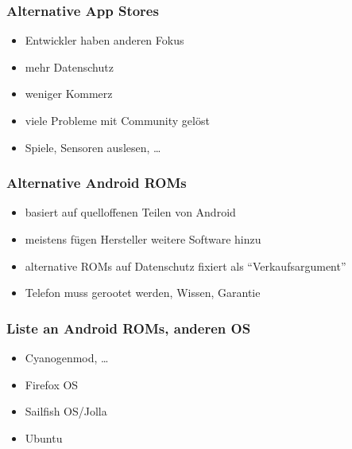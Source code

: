 \documentclass[12pt]{beamer}
\begin{document}
\begin{frame}
	\frametitle{Alternative App Stores}
	\begin{itemize}
		\item<2-> Entwickler haben anderen Fokus
		\item<3-> mehr Datenschutz
		\item<4-> weniger Kommerz
		\item<5-> viele Probleme mit Community gelöst
		\item<6-> Spiele, Sensoren auslesen, \ldots
	\end{itemize}
\end{frame}
\begin{frame}
	\frametitle{Alternative Android ROMs}
	\begin{itemize}
		\item<2-> basiert auf quelloffenen Teilen von Android
		\item<3-> meistens fügen Hersteller weitere Software hinzu
		\item<4-> alternative ROMs auf Datenschutz fixiert als "`Verkaufsargument"'
		\item<5-> Telefon muss gerootet werden, Wissen, Garantie
	\end{itemize}
\end{frame}

\begin{frame}
	\frametitle{Liste an Android ROMs, anderen OS}
	\begin{itemize}
		\item<2-> Cyanogenmod, \ldots
		\item<3-> Firefox OS
		\item<4-> Sailfish OS/Jolla
		\item<5-> Ubuntu
	\end{itemize}
\end{frame}
\end{document}
